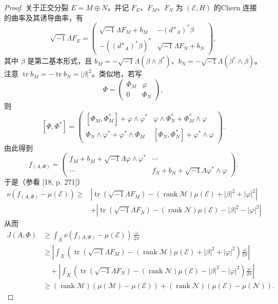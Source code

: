 \begin{proof}
关于正交分裂 $E=M\oplus N$，并记 $F_E$、$F_M$、$F_N$ 为 $(\mathcal{E},H)$ 的Chern 连接的曲率及其诱导曲率，有
\[
\sqrt{-1}\Lambda F_E=
\begin{pmatrix}
\sqrt{-1}\Lambda F_M+b_M&-(d''_A)^*\beta\\
-((d''_A)^*\beta)^*&\sqrt{-1}\Lambda F_N+b_N
\end{pmatrix},
\]
其中 $\beta$ 是第二基本形式，且 $b_M=-\sqrt{-1}\Lambda(\beta\wedge\beta^*)$、$b_N=-\sqrt{-1}\Lambda(\beta^*\wedge\beta)$。注意 $\operatorname{tr}b_M=-\operatorname{tr}b_N=|\beta|^2$。类似地，若写
\[
\Phi=\begin{pmatrix}\Phi_M&\varphi\\0&\Phi_N\end{pmatrix},
\]
则
\[
[\Phi,\Phi^*]=
\begin{pmatrix}
[\Phi_M,\Phi^*_M]+\varphi\wedge\varphi^*&\varphi\wedge\Phi^*_N+\Phi^*_M\wedge\varphi\\
\Phi_N\wedge\varphi^*+\varphi^*\wedge\Phi_M&[\Phi_N,\Phi^*_N]+\varphi^*\wedge\varphi
\end{pmatrix}.
\]
由此得到
\[
f_{(A,\Phi)}=
\begin{pmatrix}
f_M+b_M+\sqrt{-1}\Lambda\varphi\wedge\varphi^*&\cdots\\
\cdots&f_N+b_N+\sqrt{-1}\Lambda\varphi^*\wedge\varphi
\end{pmatrix}.
\]
于是（参看 [18, p. 271]）
\[
\begin{aligned}
\nu(f_{(A,\Phi)}-\mu(\mathcal{E}))\ge{}&\left|\operatorname{tr}(\sqrt{-1}\Lambda F_M)-(\operatorname{rank}\mathcal{M})\mu(\mathcal{E})+|\beta|^2+|\varphi|^2\right|\\
&+\left|\operatorname{tr}(\sqrt{-1}\Lambda F_N)-(\operatorname{rank}\mathcal{N})\mu(\mathcal{E})-|\beta|^2-|\varphi|^2\right|
\end{aligned}
\]
从而
\[
\begin{aligned}
J(A,\Phi)&\ge\int_X\nu(f_{(A,\Phi)}-\mu(\mathcal{E}))\,\frac{\omega}{2\pi}\\
&\ge\left|\int_X\left(\operatorname{tr}(\sqrt{-1}\Lambda F_M)-(\operatorname{rank}\mathcal{M})\mu(\mathcal{E})+|\beta|^2+|\varphi|^2\right)\frac{\omega}{2\pi}\right|\\
&\quad+\left|\int_X\left(\operatorname{tr}(\sqrt{-1}\Lambda F_N)-(\operatorname{rank}\mathcal{N})\mu(\mathcal{E})-|\beta|^2-|\varphi|^2\right)\frac{\omega}{2\pi}\right|\\
&\ge(\operatorname{rank}\mathcal{M})(\mu(\mathcal{M})-\mu(\mathcal{E}))+(\operatorname{rank}\mathcal{N})(\mu(\mathcal{E})-\mu(\mathcal{N})).
\end{aligned}
\]
\end{proof}

